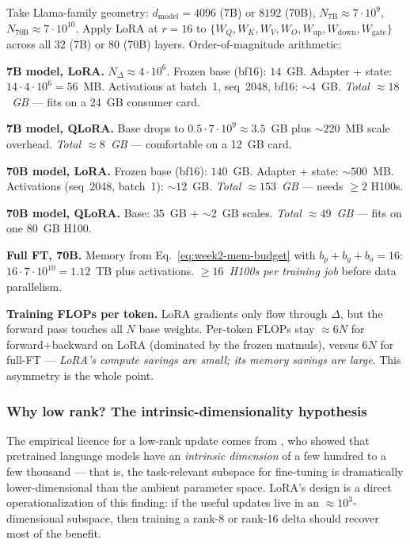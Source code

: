 \begin{workedexample}
Take Llama-family geometry: $d_{\mathrm{model}}=4096$ (7B) or $8192$ (70B),
$N_{\mathrm{7B}} \approx 7 \cdot 10^9$, $N_{\mathrm{70B}} \approx
7 \cdot 10^{10}$. Apply LoRA at $r=16$ to
$\{W_Q,W_K,W_V,W_O,W_{\mathrm{up}},W_{\mathrm{down}},W_{\mathrm{gate}}\}$
across all 32 (7B) or 80 (70B) layers. Order-of-magnitude arithmetic:

\textbf{7B model, LoRA.} $N_{\Delta} \approx 4\cdot 10^6$.
Frozen base (bf16): $14$~GB. Adapter + state: $14 \cdot 4 \cdot 10^6
= 56$~MB. Activations at batch~1, seq~2048, bf16: $\sim 4$~GB.
\emph{Total $\approx 18$~GB} --- fits on a 24~GB consumer card.

\textbf{7B model, QLoRA.} Base drops to $0.5 \cdot 7 \cdot 10^9 \approx
3.5$~GB plus $\sim 220$~MB scale overhead. \emph{Total
$\approx 8$~GB} --- comfortable on a 12~GB card.

\textbf{70B model, LoRA.} Frozen base (bf16): $140$~GB. Adapter +
state: $\sim 500$~MB. Activations (seq~2048, batch~1): $\sim 12$~GB.
\emph{Total $\approx 153$~GB} --- needs $\geq 2$ H100s.

\textbf{70B model, QLoRA.} Base: $35$~GB + $\sim 2$~GB scales.
\emph{Total $\approx 49$~GB} --- fits on one 80~GB H100.

\textbf{Full FT, 70B.} Memory from Eq.~\eqref{eq:week2-mem-budget}
with $b_p+b_g+b_o=16$: $16 \cdot 7 \cdot 10^{10} = 1.12$~TB plus
activations. \emph{$\geq 16$~H100s per training job} before data
parallelism.

\textbf{Training FLOPs per token.} LoRA gradients only flow through
$\Delta$, but the forward pass touches all $N$ base weights. Per-token
FLOPs stay $\approx 6N$ for forward+backward on LoRA
(dominated by the frozen matmuls), versus $6N$ for full-FT ---
\emph{LoRA's compute savings are small; its memory savings are
large}. This asymmetry is the whole point.
\end{workedexample}

\subsubsection{\texorpdfstring{Why low rank? The intrinsic-dimensionality hypothesis}{Why low rank? The intrinsic-dimensionality hypothesis}}

The empirical licence for a low-rank update comes from
\citet{aghajanyan2021intrinsic}, who showed that pretrained language
models have an \emph{intrinsic dimension} of a few hundred to a few
thousand --- that is, the task-relevant subspace for fine-tuning is
dramatically lower-dimensional than the ambient parameter space.
LoRA's design is a direct operationalization of this finding: if the
useful updates live in an $\approx 10^3$-dimensional subspace, then
training a rank-8 or rank-16 delta should recover most of the
benefit.

